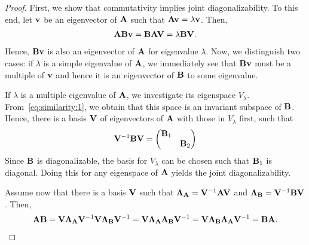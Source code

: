 \begin{proof}
  First, we show that commutativity implies joint diagonalizability. To this end, 
  let $\mathbf v$ be an eigenvector of $\mathbf A$ such that $\mathbf A\mathbf v = \lambda\mathbf v$. Then,
  \begin{gather}
    \label{eq:similarity:1}
    \mathbf A\mathbf B\mathbf v = \mathbf B\mathbf A\mathbf V = \lambda\mathbf B\mathbf V.
  \end{gather}
  Hence, $\mathbf B\mathbf v$ is also an eigenvector of $\mathbf A$ for eigenvalue
  $\lambda$. Now, we distinguish two cases: if $\lambda$ is a simple
  eigenvalue of $\mathbf A$, we immediately see that $\mathbf B\mathbf v$ must be a
  multiple of $\mathbf v$ and hence it is an eigenvector of $\mathbf B$ to some
  eigenvalue.

  If $\lambda$ is a multiple eigenvalue of $\mathbf A$, we investigate its
  eigenspace $V_\lambda$. From~\eqref{eq:similarity:1}, we obtain that
  this space is an invariant subspace of $\mathbf B$. Hence, there is a
  basis $\mathbf V$ of eigenvectors of $\mathbf A$ with those in $V_\lambda$
  first, such that
  \begin{gather}
    \mathbf V^{-1}\mathbf B\mathbf V =
    \begin{pmatrix}
      \mathbf B_1&\\&\mathbf B_2
    \end{pmatrix}
  \end{gather}
  Since $\mathbf B$ is diagonalizable, the basis for $V_\lambda$ can be
  chosen such that $\mathbf B_1$ is diagonal. Doing this for any
  eigenspace of $\mathbf A$ yields the joint diagonalizability.

  Assume now that there is a basis $\mathbf V$ such that
  $\boldsymbol\Lambda_{\mathbf A} = \mathbf V^{-1}\mathbf A\mathbf V$ and
  $\boldsymbol\Lambda_{\mathbf B} = \mathbf V^{-1}\mathbf B\mathbf V$. Then,
  \begin{gather}
    \mathbf A\mathbf B = \mathbf V\boldsymbol\Lambda_{\mathbf A}\mathbf V^{-1}\mathbf V\boldsymbol\Lambda_{\mathbf B}\mathbf V^{-1}
    = \mathbf V\boldsymbol\Lambda_{\mathbf A}\boldsymbol\Lambda_{\mathbf B}\mathbf V^{-1}
    = \mathbf V\boldsymbol\Lambda_{\mathbf B}\boldsymbol\Lambda_{\mathbf A}\mathbf V^{-1}
    = \mathbf B\mathbf A.
  \end{gather}
\end{proof}

